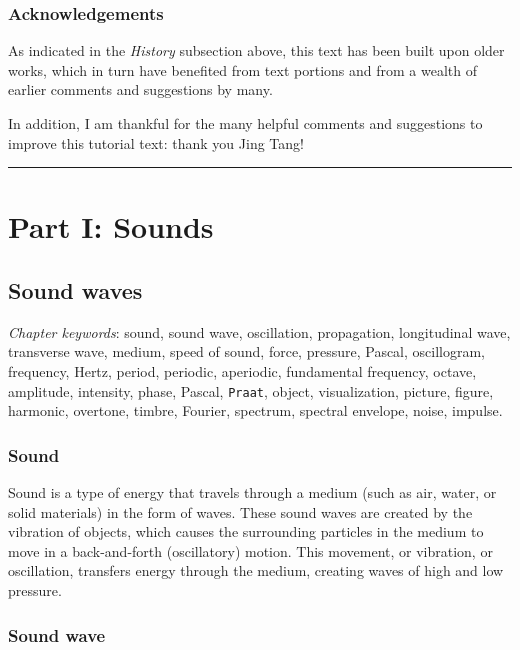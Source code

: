 \documentclass[
]{book}
\begin{document}
\section*{Acknowledgements}\label{acknowledgements}

As indicated in the \emph{History} subsection above, this text has been built upon older works, which in turn have benefited from text portions and from a wealth of earlier comments and suggestions by many.

In addition, I am thankful for the many helpful comments and suggestions to improve this tutorial text: thank you Jing Tang!

\begin{center}\rule{0.5\linewidth}{0.5pt}\end{center}

\part*{Part I: Sounds}\label{part-part-i-sounds}

\chapter{Sound waves}\label{ch-soundwaves}

\emph{Chapter keywords}: sound, sound wave, oscillation, propagation, longitudinal wave, transverse wave, medium, speed of sound, force, pressure, Pascal, oscillogram, frequency, Hertz, period, periodic, aperiodic, fundamental frequency, octave, amplitude, intensity, phase, Pascal, \texttt{Praat}, object, visualization, picture, figure, harmonic, overtone, timbre, Fourier, spectrum, spectral envelope, noise, impulse.

\section{Sound}\label{sound}

Sound is a type of energy that travels through a medium (such as air, water, or solid materials) in the form of waves. These sound waves are created by the vibration of objects, which causes the surrounding particles in the medium to move in a back-and-forth (oscillatory) motion. This movement, or vibration, or oscillation, transfers energy through the medium, creating waves of high and low pressure.

\section{Sound wave}\label{sec:soundwave}
\end{document}
